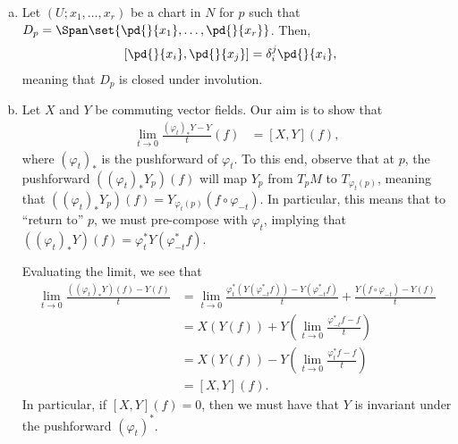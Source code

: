 \documentclass[10pt]{mypackage}
\begin{document}
\begin{solution}\hfill
  \begin{enumerate}[(a)]
    \item Let $\left( U;x_1,\dots,x_r \right)$ be a chart in $N$ for $p$ such that $D_p = \Span\set{ \pd{}{x_1},\dots, \pd{}{x_r} }$. Then,
      \begin{align*}
        \left[ \pd{}{x_i},\pd{}{x_j} \right] &= \delta_{i}^{j} \pd{}{x_i},
      \end{align*}
      meaning that $D_p$ is closed under involution.
    \item Let $X$ and $Y$ be commuting vector fields. Our aim is to show that
      \begin{align*}
        \lim_{t\rightarrow 0} \frac{\left( \varphi_t \right)_{\ast}Y - Y}{t}(f) &= \left[ X,Y \right](f),
      \end{align*}
      where $\left( \varphi_t \right)_{\ast}$ is the pushforward of $\varphi_t$. To this end, observe that at $p$, the pushforward $\left( \left( \varphi_t \right)_{\ast}Y_p \right)(f)$ will map $Y_p$ from $T_pM$ to $T_{\varphi_t(p)}$, meaning that $\left( \left( \varphi_t \right)_{\ast} Y_p \right)(f) = Y_{\varphi_t(p)} \left( f\circ \varphi_{-t} \right)$. In particular, this means that to ``return to'' $p$, we must pre-compose with $\varphi_t$, implying that $\left( \left( \varphi_t \right)_{\ast}Y \right)(f) = \varphi_t^{\ast}Y\left( \varphi_{-t}^{\ast}f \right)$.\newline

      Evaluating the limit, we see that
      \begin{align*}
        \lim_{t\rightarrow 0} \frac{\left( \left( \varphi_t \right)_{\ast}Y \right)(f) - Y(f)}{t} &= \lim_{t\rightarrow 0} \frac{\varphi_t^{\ast}\left( Y\left( \varphi_{-t}^{\ast}f \right) \right) - Y\left( \varphi_{-t}^{\ast}f \right)}{t} + \frac{Y\left( f\circ \varphi_{-t} \right) - Y(f)}{t}\\
                                                                                                  &= X\left( Y(f) \right) + Y\left( \lim_{t\rightarrow 0} \frac{\varphi_{-t}^{\ast}f - f}{t} \right)\\
                                                                                                  &= X\left( Y(f) \right) - Y\left( \lim_{t\rightarrow 0} \frac{\varphi_t^{\ast}f - f}{t} \right)\\
                                                                                                  &= \left[ X,Y \right](f).
      \end{align*}
      In particular, if $ \left[ X,Y \right](f) = 0 $, then we must have that $Y$ is invariant under the pushforward $\left( \varphi_t \right)^{\ast}$.\newline


\end{enumerate}
\end{solution}
\end{document}
